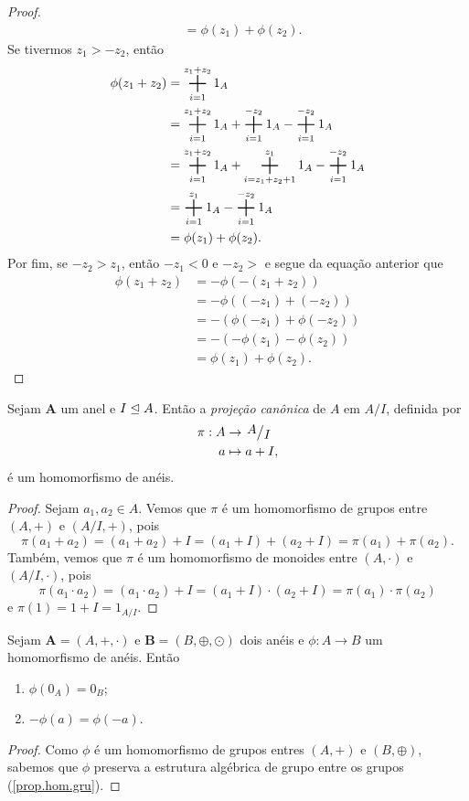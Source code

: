 \begin{proof}
\begin{align*}
		&= \phi(z_1)+\phi(z_2).
	\end{align*}
Se tivermos $z_1>-z_2$, então
	\begin{align*}
	\phi(z_1+z_2) &= \bigsum_{i=1}^{z_1+z_2} 1_A \\
		&= \bigsum_{i=1}^{z_1+z_2} 1_A + \bigsum_{i=1}^{-z_2} 1_A - \bigsum_{i=1}^{-z_2} 1_A \\
		&= \bigsum_{i=1}^{z_1+z_2} 1_A + \bigsum_{i=z_1+z_2+1}^{z_1} 1_A - \bigsum_{i=1}^{-z_2} 1_A \\
		&= \bigsum_{i=1}^{z_1} 1_A - \bigsum_{i=1}^{-z_2} 1_A \\
		&= \phi(z_1)+\phi(z_2).
	\end{align*}
Por fim, se $-z_2>z_1$, então $-z_1<0$ e $-z_2>$ e segue da equação anterior que
	\begin{align*}
	\phi(z_1+z_2) &= -\phi(-(z_1+z_2)) \\
		&= -\phi((-z_1)+(-z_2)) \\
		&= -(\phi(-z_1)+\phi(-z_2)) \\
		&= -(-\phi(z_1)-\phi(z_2)) \\
		&= \phi(z_1)+\phi(z_2).
	\end{align*}
\end{proof}

\begin{ex}
	Sejam $\bm A$ um anel e $I \mathrel{\unlhd} A$. Então a \emph{projeção canônica} de $A$ em $A/I$, definida por
	\begin{align*}
	\pi: A &\to \quo{A}{I} \\
		a &\mapsto a+I,
	\end{align*}
é um homomorfismo de anéis.
\end{ex}
\begin{proof}
	Sejam $a_1,a_2 \in A$. Vemos que $\pi$ é um homomorfismo de grupos entre $(A,+)$ e $(A/I,+)$, pois
	\begin{equation*}
	\pi(a_1+a_2) = (a_1+a_2)+I = (a_1+I)+(a_2+I) = \pi(a_1)+\pi(a_2).
	\end{equation*}
Também, vemos que $\pi$ é um homomorfismo de monoides entre $(A,\cdot)$ e $(A/I,\cdot)$, pois
	\begin{equation*}
	\pi(a_1 \cdot a_2) = (a_1 \cdot a_2)+I = (a_1+I) \cdot (a_2+I) = \pi(a_1) \cdot \pi(a_2)
	\end{equation*}
e $\pi(1)=1+I=1_{A/I}$.
\end{proof}

\begin{coro}
	Sejam $\bm A=(A,+,\cdot)$ e $\bm B=(B,\oplus,\odot)$ dois anéis e $\phi: A \to B$ um homomorfismo de anéis. Então
	\begin{enumerate}
	\item $\phi(0_A)=0_B$;
	\item $-\phi(a)=\phi(-a)$.
	\end{enumerate}
\end{coro}
\begin{proof}
	Como $\phi$ é um homomorfismo de grupos entres $(A,+)$ e $(B,\oplus)$, sabemos que $\phi$ preserva a estrutura algébrica de grupo entre os grupos (\ref{prop.hom.gru}).
\end{proof}

